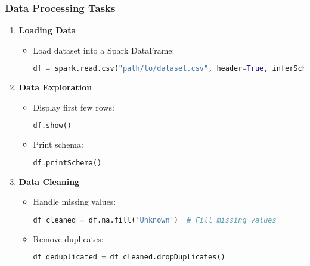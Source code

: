 \documentclass{beamer}
\begin{document}
\begin{frame}[fragile]
    \frametitle{Data Processing Tasks}

    \begin{enumerate}
        \item \textbf{Loading Data}
        \begin{itemize}
            \item Load dataset into a Spark DataFrame:
            \begin{lstlisting}[language=python]
df = spark.read.csv("path/to/dataset.csv", header=True, inferSchema=True)
            \end{lstlisting}
        \end{itemize}

        \item \textbf{Data Exploration}
        \begin{itemize}
            \item Display first few rows:
            \begin{lstlisting}[language=python]
df.show()
            \end{lstlisting}
            \item Print schema:
            \begin{lstlisting}[language=python]
df.printSchema()
            \end{lstlisting}
        \end{itemize}

        \item \textbf{Data Cleaning}
        \begin{itemize}
            \item Handle missing values:
            \begin{lstlisting}[language=python]
df_cleaned = df.na.fill('Unknown')  # Fill missing values
            \end{lstlisting}
            \item Remove duplicates:
            \begin{lstlisting}[language=python]
df_deduplicated = df_cleaned.dropDuplicates()
            \end{lstlisting}
        \end{itemize}
    \end{enumerate}
\end{frame}
\end{document}

